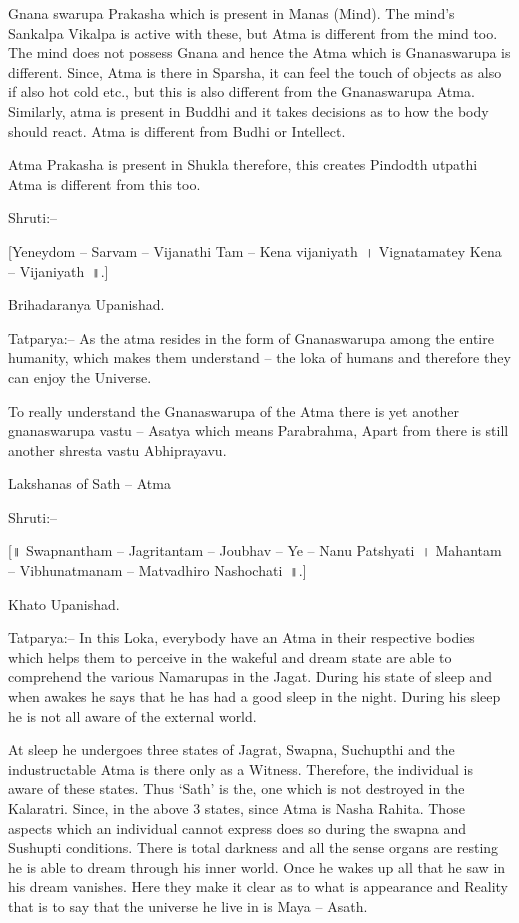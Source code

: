 Gnana swarupa Prakasha which is present in Manas (Mind). The mind's Sankalpa Vikalpa is active with these, but Atma is different from the mind too. The mind does not possess Gnana and hence the Atma which is Gnanaswarupa is different. Since, Atma is there in Sparsha, it can feel the touch of objects as also if also hot cold etc., but this is also different from the Gnanaswarupa Atma. Similarly, atma is present in Buddhi and it takes decisions as to how the body should react. Atma is different from Budhi or Intellect.

Atma Prakasha is present in Shukla therefore, this creates Pindodth utpathi Atma is different from this too.

Shruti:–

[Yeneydom – Sarvam – Vijanathi Tam – Kena vijaniyath~। Vignatamatey Kena – Vijaniyath~॥.]

Brihadaranya Upanishad.

Tatparya:– As the atma resides in the form of Gnanaswarupa among the entire humanity, which makes them understand – the loka of humans and therefore they can enjoy the Universe.

To really understand the Gnanaswarupa of the Atma there is yet another gnanaswarupa vastu – Asatya which means Parabrahma, Apart from there is still another shresta vastu Abhiprayavu.

Lakshanas of Sath – Atma

Shruti:–

[॥ Swapnantham – Jagritantam – Joubhav – Ye – Nanu Patshyati~। Mahantam – Vibhunatmanam – Matvadhiro Nashochati~॥.]

Khato Upanishad.

Tatparya:– In this Loka, everybody have an Atma in their respective bodies which helps them to perceive in the wakeful and dream state are able to comprehend the various Namarupas in the Jagat. During his state of sleep and when awakes he says that he has had a good sleep in the night. During his sleep he is not all aware of the external world.

At sleep he undergoes three states of Jagrat, Swapna, Suchupthi and the industructable Atma is there only as a Witness. Therefore, the individual is aware of these states. Thus ‘Sath’ is the, one which is not destroyed in the Kalaratri. Since, in the above 3 states, since Atma is Nasha Rahita. Those aspects which an individual cannot express does so during the swapna and Sushupti conditions. There is total darkness and all the sense organs are resting he is able to dream through his inner world. Once he wakes up all that he saw in his dream vanishes. Here they make it clear as to what is appearance and Reality that is to say that the universe he live in is Maya – Asath.

